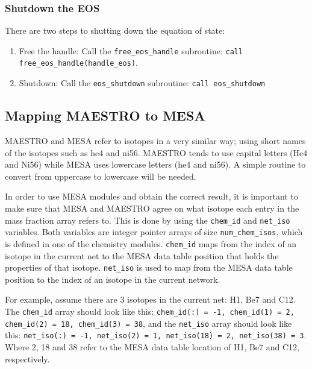 \subsubsection{Shutdown the EOS}

There are two steps to shutting down the equation of state:
\begin{enumerate}
\item Free the handle: Call the {\tt free\_eos\_handle} subroutine: 
{\tt call free\_eos\_handle(handle\_eos)}.

\item Shutdown: Call the {\tt eos\_shutdown} subroutine: 
{\tt call eos\_shutdown}
\end{enumerate}


\subsection{Mapping {\sf MAESTRO} to {\sf MESA}}
\label{sec:mapping}

{\sf MAESTRO} and {\sf MESA} refer to isotopes in a very similar way; using 
short names of the isotopes such as he4 and ni56. {\sf MAESTRO} 
tends to use capital letters (He4 and Ni56) while {\sf MESA} uses 
lowercase letters (he4 and ni56). A simple routine to convert from 
uppercase to lowercase will be needed.

In order to use {\sf MESA} modules and obtain the correct result, it is 
important to make sure that {\sf MESA} and {\sf MAESTRO} agree on what 
isotope each entry in the mass fraction array refers to. This is done by 
using the {\tt chem\_id} and {\tt net\_iso} variables. Both variables are 
integer pointer arrays of size {\tt num\_chem\_isos}, which is defined in one 
of the chemistry modules. {\tt chem\_id} maps from the index of an isotope in 
the current net to the {\sf MESA} data table position that holds the 
properties of that isotope. {\tt net\_iso} is used to map from the {\sf MESA} 
data table position to the index of an isotope in the current network. 

For example, assume there are 3 isotopes in the current net: H1, Be7 and C12. 
The {\tt chem\_id} array should look like this: {\tt chem\_id(:) = -1, 
chem\_id(1) = 2, chem\_id(2) = 18, chem\_id(3) = 38}, and the 
{\tt net\_iso} array should look like this: {\tt net\_iso(:) = -1, 
net\_iso(2) = 1, net\_iso(18) = 2, net\_iso(38) = 3}. Where 2, 18 and 38 
refer to the {\sf MESA} data table location of H1, Be7 and C12, respectively.

